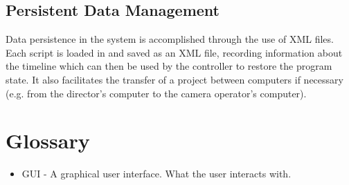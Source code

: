 \documentclass[11pt,twoside,a4paper]{article}
\begin{document}
\subsection{Persistent Data Management}
Data persistence in the system is accomplished through the use of XML files. Each script is loaded in and saved as an XML file, recording information about the timeline which can then be used by the controller to restore the program state. It also facilitates the transfer of a project between computers if necessary (e.g. from the director's computer to the camera operator's computer).

\section{Glossary}
\begin{itemize}
  \item GUI - A graphical user interface. What the user interacts with.
\end{itemize}
\end{document}
